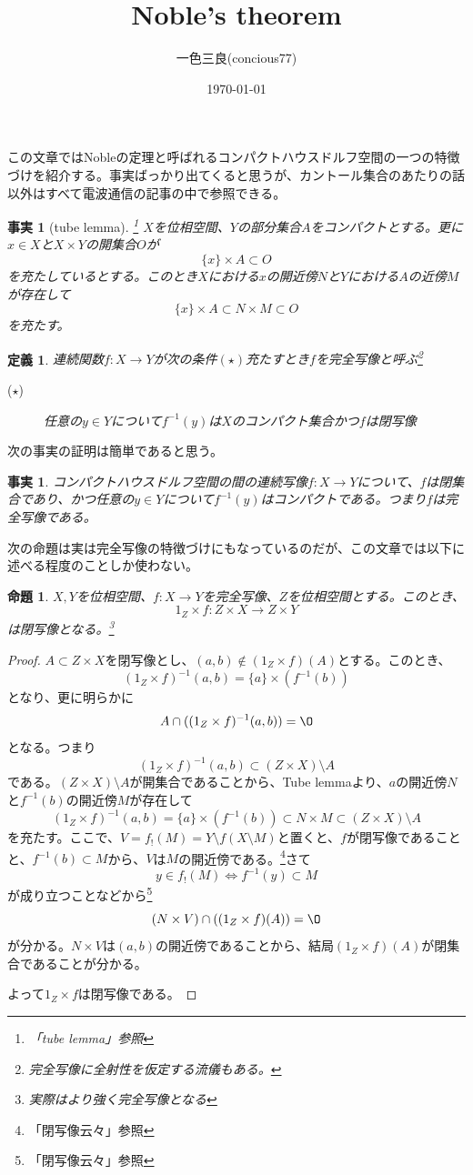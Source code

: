 \documentclass[leqno]{jsarticle}
\title{Noble's theorem}
\author{一色三良(concious77)}
\date{\today}
\newtheorem{prop}[thm]{命題}
\newtheorem{df}[thm]{定義}
\newtheorem{fact}[thm]{事実}
\begin{document}
\maketitle
この文章ではNobleの定理と呼ばれるコンパクトハウスドルフ空間の一つの特徴づけを紹介する。事実ばっかり出てくると思うが、カントール集合のあたりの話以外はすべて電波通信の記事の中で参照できる。

\begin{fact}[tube lemma]\label{1}\footnote{「tube lemma」参照}
$X$を位相空間、$Y$の部分集合$A$をコンパクトとする。更に$x\in X$と$X\times Y$の開集合$O$が
\[
\{x\}\times A\subset O
\]
を充たしているとする。このとき$X$における$x$の開近傍$N$と$Y$における$A$の近傍$M$が存在して
\[
\{x\}\times A\subset N\times M\subset O
\]
を充たす。
\end{fact}
\begin{df}連続関数$f:X\to Y$が次の条件$(\star)$充たすとき$f$を完全写像と呼ぶ\footnote{完全写像に全射性を仮定する流儀もある。}
\begin{description}
\item[($\star$)]任意の$y\in Y$について$f^{-1}(y)$は$X$のコンパクト集合かつ$f$は閉写像
\end{description}
\end{df}

次の事実の証明は簡単であると思う。
\begin{fact}\label{2}
コンパクトハウスドルフ空間の間の連続写像$f:X\to Y$について、$f$は閉集合であり、かつ任意の$y\in Y$について$f^{-1}(y)$はコンパクトである。つまり$f$は完全写像である。
\end{fact}

次の命題は実は完全写像の特徴づけにもなっているのだが、この文章では以下に述べる程度のことしか使わない。
\begin{prop}\label{3}
$X,Y$を位相空間、$f:X\to Y$を完全写像、$Z$を位相空間とする。このとき、
\[
1_Z\times f:Z\times X\to Z\times Y
\]
は閉写像となる。\footnote{実際はより強く完全写像となる}
\end{prop}
\begin{proof}
$A\subset Z\times X$を閉写像とし、$(a,b)\not\in (1_Z\times f)(A)$とする。このとき、
\[
(1_Z\times f)^{-1}(a,b)=\{a\}\times(f^{-1}(b))
\]
となり、更に明らかに
\[
A\cap((1_Z\times f)^{-1}(a,b))=\O
\]
となる。つまり
\[
(1_Z\times f)^{-1}(a,b)\subset (Z\times X)\setminus A
\]
である。$(Z\times X)\setminus A$が開集合であることから、Tube lemmaより、$a$の開近傍$N$と$f^{-1}(b)$の開近傍$M$が存在して
\[
(1_Z\times f)^{-1}(a,b)=\{a\}\times(f^{-1}(b))\subset N\times M\subset (Z\times X)\setminus A
\]
を充たす。ここで、$V=f_!(M)=Y\setminus f(X\setminus M)$と置くと、$f$が閉写像であることと、$f^{-1}(b)\subset M$から、$V$は$M$の開近傍である。\footnote{「閉写像云々」参照}さて
\[
y\in f_!(M)\iff f^{-1}(y)\subset M
\]
が成り立つことなどから\footnote{「閉写像云々」参照}
\[
(N\times V)\cap((1_Z\times f)(A))=\O
\]
が分かる。$N\times V$は$(a,b)$の開近傍であることから、結局$(1_Z\times f)(A)$が閉集合であることが分かる。\par
よって$1_Z\times f$は閉写像である。
\end{proof}
\end{document}
